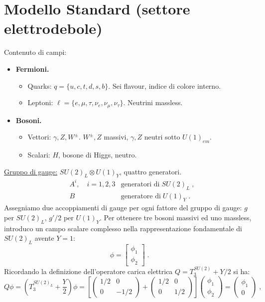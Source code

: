 \documentclass[12pt,a4paper]{article}
\theoremstyle{definition}
\numberwithin{equation}{section}
\begin{document}
\section{Modello Standard (settore elettrodebole)}
Contenuto di campi:
\begin{itemize}
\item \textbf{Fermioni.}
\begin{itemize}
\item Quarks: $q=\{u,c,t,d,s,b\}$. Sei flavour, indice di colore interno.
\item Leptoni: $\ell=\{e,\mu,\tau,\nu_e,\nu_{\mu},\nu_{\tau}\}$. Neutrini massless.
\end{itemize}
\item \textbf{Bosoni.}
\begin{itemize}
\item Vettori: $\gamma,Z,W^{\pm}$. $W^{\pm},Z$ massivi, $\gamma,Z$ neutri sotto $U(1)_{em}$.
\item Scalari: $H$, bosone di Higgs, neutro.
\end{itemize}
\end{itemize}
\underline{Gruppo di gauge:}  $SU(2)_L\otimes U(1)_Y$, quattro generatori.
\begin{align*}
&A^i,\quad i=1,2,3 &\mbox{generatori di}\; SU(2)_L\;, \\
&B &\mbox{generatore di}\; U(1)_Y\;.
\end{align*}
Assegniamo due accoppiamenti di gauge per ogni fattore del gruppo di gauge: $g$ per $SU(2)_L$, $g'/2$ per $U(1)_Y$.  Per ottenere tre bosoni massivi ed uno massless, introduco un campo scalare complesso nella rappresentazione fondamentale di $SU(2)_L$ avente $Y=1$:
\begin{equation}
\phi=\left[\begin{matrix}
\phi_1 \\
\phi_2
\end{matrix}\right]\;.
\end{equation}
Ricordando la definizione dell'operatore carica elettrica $Q=T_3^{SU(2)}+Y/2$ si ha:
\begin{equation}
Q\phi=\left(T_3^{SU(2)_L}+\frac{Y}{2}\right)\phi=\left[\left(\begin{matrix}
1/2 & 0 \\
0 & -1/2
\end{matrix}\right)+\left(\begin{matrix}
1/2 & 0 \\
0 & 1/2
\end{matrix}\right)\right]\left(\begin{matrix}
\phi_1 \\
\phi_2
\end{matrix}\right)=\left(\begin{matrix}
\phi_1 \\
0
\end{matrix}\right)\;,
\end{equation}
\end{document}
